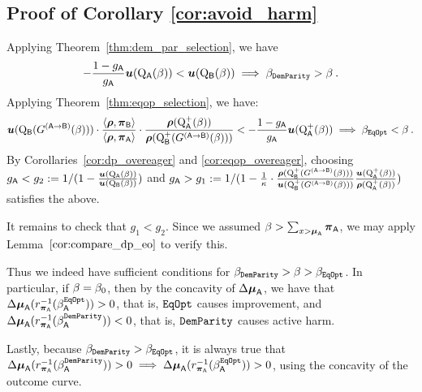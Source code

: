 \subsection{Proof of Corollary \ref{cor:avoid_harm} }
	
	Applying Theorem~\ref{thm:dem_par_selection}, we have
		\[-\frac{1-g_{\mathsf{A}}}{g_{\mathsf{A}}} \boldsymbol{u}(\mathrm{Q}_{\mathsf{A}}(\beta))  < \boldsymbol{u}(\mathrm{Q}_{\mathsf{B}}(\beta)) \implies \beta_{\mathtt{DemParity}} > \beta\:. \]
		Applying Theorem~\ref{thm:eqop_selection}, we have:	\[\boldsymbol{u}(\mathrm{Q}_{\mathsf{B}}(G^{(\mathsf{A}\to\mathsf{B})}(\beta)))\cdot \frac{\langle \boldsymbol{\rho}, \boldsymbol{\pi}_{\mathsf{B}}\rangle}{ \langle \boldsymbol{\rho}, \boldsymbol{\pi}_{\mathsf{A}}\rangle} \cdot  \frac{\boldsymbol{\rho}(\mathrm{Q}^+_{\mathsf{A}}(\beta))}{\boldsymbol{\rho}(\mathrm{Q}^+_{\mathsf{B}}(G^{(\mathsf{A}\to\mathsf{B})}(\beta)))} < -\frac{1-g_{\mathsf{A}}}{g_{\mathsf{A}}} \boldsymbol{u}(\mathrm{Q}_{\mathsf{A}}^+(\beta)) \implies \beta_{\mathtt{EqOpt}} < \beta\:. \] 
	By Corollaries~\ref{cor:dp_overeager} and \ref{cor:eqop_overeager}, choosing $g_{\mathsf{A}} < g_2:= 1/(1-\frac{\boldsymbol{u}(\mathrm{Q}_{\mathsf{A}}(\beta))}{\boldsymbol{u}(\mathrm{Q}_{\mathsf{B}}(\beta))})$ and $g_{\mathsf{A}} > g_1 :=1/(1-\frac{1}{\kappa}\cdot\frac{\boldsymbol{\rho}(\mathrm{Q}^+_{\mathsf{B}}(G^{(\mathsf{A}\to\mathsf{B})}(\beta)))}{\boldsymbol{u}(\mathrm{Q}^+_{\mathsf{B}}(G^{(\mathsf{A}\to\mathsf{B})}(\beta)))}\frac{\boldsymbol{u}(\mathrm{Q}^+_{\mathsf{A}}(\beta))}{\boldsymbol{\rho}(\mathrm{Q}^+_{\mathsf{A}}(\beta))})$ satisfies the above.
	
	It remains to check that $g_1 < g_2$. Since we assumed $\beta > \sum_{x > \boldsymbol{\mu} _{\mathsf{A}} } \boldsymbol{\pi}_{\mathsf{A}}$, we may apply Lemma~$\ref{cor:compare_dp_eo}$ to verify this.
	
	Thus we indeed have sufficient conditions for $\beta_{\mathtt{DemParity}} > \beta > \beta_{\mathtt{EqOpt}}$. In particular, if $\beta=\beta_0$, then by the concavity of $\Delta\boldsymbol{\mu}_{\mathsf{A}}$, we have that  $\Delta\boldsymbol{\mu}_{\mathsf{A}}(r^{-1}_{\boldsymbol{\pi}_{\mathsf{A}}}(\beta^{\mathtt{EqOpt}}_{\mathsf{A}}))> 0$, that is, $\mathtt{EqOpt}$ causes improvement, and $\Delta\boldsymbol{\mu}_{\mathsf{A}}(r^{-1}_{\boldsymbol{\pi}_{\mathsf{A}}}(\beta^{\mathtt{DemParity}}_{\mathsf{A}}))< 0$, that is, $\mathtt{DemParity}$ causes active harm. 
	
	
	Lastly, because $\beta_{\mathtt{DemParity}} >  \beta_{\mathtt{EqOpt}}$, it is always true that $\Delta\boldsymbol{\mu}_{\mathsf{A}}(r^{-1}_{\boldsymbol{\pi}_{\mathsf{A}}}(\beta^{\mathtt{DemParity}}_{\mathsf{A}})) > 0 \implies \Delta\boldsymbol{\mu}_{\mathsf{A}}(r^{-1}_{\boldsymbol{\pi}_{\mathsf{A}}}(\beta^{\mathtt{EqOpt}}_{\mathsf{A}}))> 0$, using the concavity of the outcome curve. 
	
	
	
